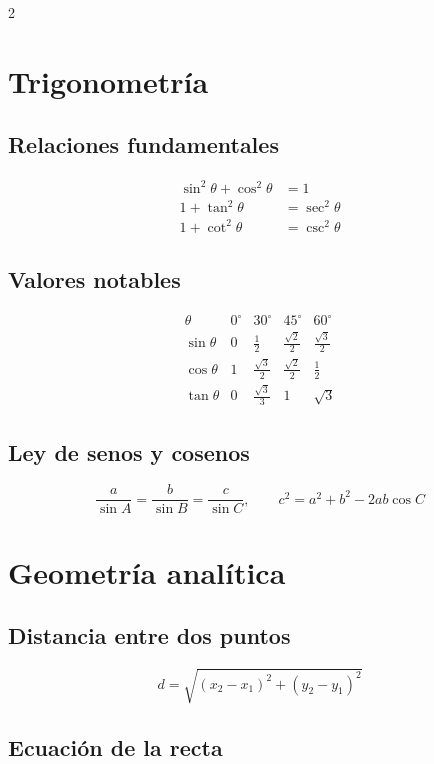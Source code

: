\documentclass[12pt]{article}
\begin{document}
\begin{multicols}{2}
\section*{Trigonometría}

\subsection*{Relaciones fundamentales}
\begin{align*}
    \sin^2\theta + \cos^2\theta &= 1 \\
    1 + \tan^2\theta &= \sec^2\theta \\
    1 + \cot^2\theta &= \csc^2\theta
\end{align*}

\subsection*{Valores notables}
\[
\begin{array}{c|cccc}
\theta & 0^\circ & 30^\circ & 45^\circ & 60^\circ \\ \hline
\sin\theta & 0 & \frac12 & \frac{\sqrt{2}}{2} & \frac{\sqrt{3}}{2} \\
\cos\theta & 1 & \frac{\sqrt{3}}{2} & \frac{\sqrt{2}}{2} & \frac12 \\
\tan\theta & 0 & \frac{\sqrt{3}}{3} & 1 & \sqrt{3}
\end{array}
\]

\subsection*{Ley de senos y cosenos}
\[
\frac{a}{\sin A} = \frac{b}{\sin B} = \frac{c}{\sin C}, \qquad
c^2 = a^2 + b^2 - 2ab\cos C
\]

\section*{Geometría analítica}

\subsection*{Distancia entre dos puntos}
\[
d = \sqrt{(x_2-x_1)^2 + (y_2-y_1)^2}
\]

\subsection*{Ecuación de la recta}



\end{multicols}
\end{document}
